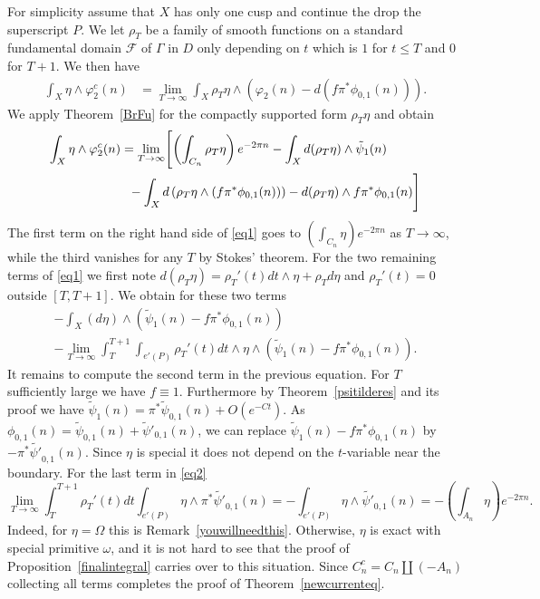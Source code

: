 \documentclass[12pt,leqno]{amsart}
\numberwithin{equation}{section}
\theoremstyle{plain}
\theoremstyle{definition}
\theoremstyle{remark}
\newcommand{\G}{\Gamma}
\newcommand{\calF}{\mathcal{F}}
\begin{document}
For simplicity assume that $X$ has only one cusp and continue the drop the superscript $P$. We let $\rho_{T}$ be a family of smooth functions on a standard fundamental domain $\calF$ of $\G$ in $D$ only depending on $t$ which is $1$ for $t\leq T$ and $0$ for $T+1$. We then have 
\begin{align*}
\int_{X} \eta \wedge \varphi^c_{2}(n)  &= \lim_{T\to \infty} \int_{X} \rho_T \eta \wedge
\left(\varphi_2(n) -  d(f \pi^{\ast} \phi_{0,1}(n)) \right). 
\end{align*}
We apply Theorem~\ref{BrFu} for the compactly supported form $\rho_T\eta$ and obtain
\begin{align}\label{eq1}
\int_{X} \eta \wedge \varphi^c_{2}(n&)=  \lim_{T\to \infty} \Biggl[ \left(\int_{C_n}  \rho_T \eta \right) e^{- 2\pi n} - \int_{X}  d (\rho_T \eta) \wedge \tilde{\psi}_1(n) \\
& \quad - \int_X  d\left( \rho_T \eta \wedge (f \pi^{\ast} \phi_{0,1}(n)) \right) - d(\rho_T \eta) \wedge f \pi^{\ast} \phi_{0,1}(n) \Biggr] \notag
\end{align}
The first term on the right hand side of \eqref{eq1} goes to $\left(\int_{C_n} \eta\right)e^{-2\pi n}$ as $T \to \infty$, while the third vanishes for any $T$ by Stokes' theorem. For the two remaining terms of \eqref{eq1} we first note $d(\rho_T \eta) = \rho_T'(t) dt \wedge \eta + \rho_T d\eta$ and  $\rho_T'(t)=0$ outside $[T,T+1]$. We obtain for these two terms
\begin{multline}\label{eq2}
-  \int_{X}  (d \eta) \wedge \left( \tilde{\psi}_1(n) - f \pi^{\ast} \phi_{0,1}(n) \right) \\ - \lim_{T\to \infty} \int_T^{T+1} \int_{e'(P)} \rho_T'(t)dt \wedge \eta \wedge \left( \tilde{\psi}_1(n) - f  \pi^{\ast}\phi_{0,1}(n)\right). 
\end{multline}
It remains to compute the second term in the previous equation. For $T$ sufficiently large we have $f \equiv 1$. Furthermore by Theorem~\ref{psitilderes} and its proof we have $\tilde{\psi}_1(n) = \pi^{\ast} \tilde{\psi}_{0,1}(n) + O(e^{-Ct})$. As
$\phi_{0,1}(n) = \tilde{\psi}_{0,1}(n)+\tilde{\psi}'_{0,1}(n)$, we can replace  
$\tilde{\psi}_1(n) - f  \pi^{\ast}\phi_{0,1}(n)$ by $-\pi^{\ast} \tilde{\psi'}_{0,1}(n)$. Since $\eta$ is special it does not depend on the $t$-variable near the boundary. For the last term in \eqref{eq2}
\[
 \lim_{T\to \infty} \int_T^{T+1}  \rho_T'(t)dt \int_{e'(P)} \eta \wedge \pi^{\ast} \tilde{\psi'}_{0,1}(n) = -  \int_{e'(P)} \eta \wedge \tilde{\psi'}_{0,1}(n) = -
\left(\int_{A_n} \eta \right) e^{-2\pi n}.
\]
Indeed, for $\eta = \Omega$ this is Remark~\ref{youwillneedthis}. Otherwise, $\eta$ is exact with special primitive $\omega$, and it is not hard to see that the proof of Proposition~\ref{finalintegral} carries over to this situation. Since $C_n^c = C_n \coprod (-A_n)$ collecting all terms completes the proof of Theorem~\ref{newcurrenteq}. 
\end{document}
